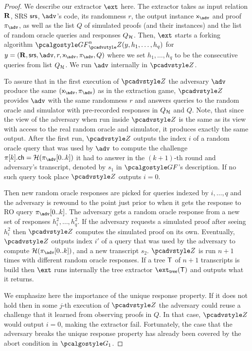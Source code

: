 \documentclass[runningheads,10pt]{llncs}
\begin{document}
\begin{proof}
We describe our extractor $\ext$ here. The extractor takes as input relation
$\mathbf{R}$, SRS $\mathsf{srs}$, $\advse$'s code, its randomness $r$, the output instance
$\inp_{\advse}$ and proof $\zkproof_{\advse}$, as well as the list $Q$ of
simulated proofs (and their instances) and the list of random oracle queries and
responses $Q_{\mathcal{H}}$. Then, $\ext$ starts a forking algorithm
$\genforking^{n}_\zdv(y,h_1, \ldots, h_q)$ for
$y = (\REL, \srs, \advse, r, \inp_{\advse}, \zkproof_{\advse}, Q)$ where we set
$h_1, \ldots, h_q$ to be the consecutive queries from list $Q_{\mathcal{H}}$. We run
$\advse$ internally in $\zdv$.%

To assure that in the first execution of $\zdv$ the adversary $\advse$ produce
the same $(\inp_{\advse}, \zkproof_{\advse})$ as in the extraction game, $\zdv$
provides $\advse$ with the same randomness $r$ and answers queries to the random
oracle and simulator with pre-recorded responses in $Q_{\mathcal{H}}$ and $Q$.
%
Note, that since the view of the adversary when run inside $\zdv$ is the same as its
view with access to the real random oracle and simulator, it produces exactly the
same output. After the first run, $\zdv$ outputs the index $i$ of a random oracle
query that was used by $\advse$ to compute the challenge $\zkproof[k].\ch =
\ro(\zkproof_{\advse}[0..k])$ it had to answer in the $(k + 1)$-th round and
adversary's transcript, denoted by $s_1$ in $\genforking$'s description. If no
such query took place $\zdv$ outputs $i = 0$.

Then new random oracle responses are picked for queries indexed by
$i, \ldots, q$ and the adversary is rewound to the point just prior to when it gets the
response to RO query $\zkproof_{\advse}[0..k]$. The adversary gets a random
oracle response from a new set of responses $h^2_i, \ldots, h^2_q$. If the
adversary requests a simulated proof after seeing $h^2_i$ then $\zdv$ computes
the simulated proof on its own. Eventually, $\zdv$ outputs index $i'$ of a query
that was used by the adversary to compute $\ro(\zkproof_{\advse}[0..k])$, and a
new transcript $s_2$. $\zdv$ is run $n + 1$ times with different random oracle
responses. If a tree $\mathsf{T}$ of $n + 1$ transcripts is build then $\ext$
runs internally the tree extractor $\extt(\tree)$ and outputs what it returns.

We emphasize here the importance of the unique response property. If it does not
hold then in some $j$-th execution of $\zdv$ the adversary could reuse a
challenge that it learned from observing proofs in $Q$. In that case, $\zdv$
would output $i = 0$, making the extractor fail. Fortunately, the case that the
adversary breaks the unique response property has already been covered by the
abort condition in $\game{1}$.


\end{proof}
\end{document}
